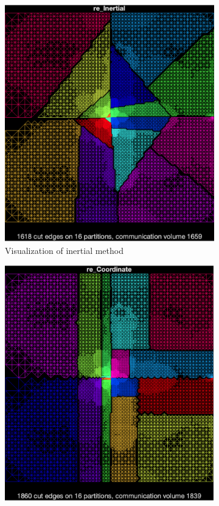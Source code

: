 \documentclass[unicode,11pt,a4paper,oneside,numbers=endperiod,openany]{scrartcl}
\begin{document}
\begin{figure}[htbp]
    \centering
    
    \begin{subfigure}[b]{0.3\textwidth}
        \includegraphics[width=\textwidth]{images/inertial.png}
        \caption{Visualization of inertial method}
    \end{subfigure}
    \hfill
    \begin{subfigure}[b]{0.3\textwidth}
        \includegraphics[width=\textwidth]{images/coordinate.png}

\end{subfigure}
\end{figure}
\end{document}
